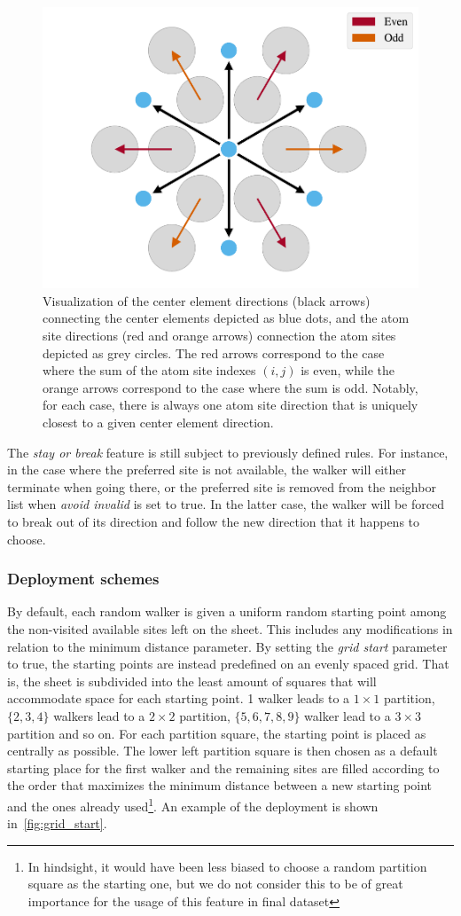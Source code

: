 \begin{figure}[!htb]
  \centering
  \includegraphics[width=0.5\linewidth]{figures/system/stay_or_break.pdf}
  \caption{Visualization of the center element directions (black arrows) connecting the center elements depicted as blue dots, and the atom site directions (red and orange arrows) connection the atom sites depicted as grey circles. The red arrows correspond to the case where the sum of the atom site indexes $(i,j)$ is even, while the orange arrows correspond to the case where the sum is odd. Notably, for each case, there is always one atom site direction that is uniquely closest to a given center element direction.}
  \label{fig:stay_or_break}
\end{figure}

The \textit{stay or break} feature is still subject to previously defined rules.
For instance, in the case where the preferred site is not available, the walker
will either terminate when going there, or the preferred site is removed from
the neighbor list when \textit{avoid invalid} is set to true. In the latter
case, the walker will be forced to break out of its direction and follow the new
direction that it happens to choose.


\subsubsection{Deployment schemes} %
By default, each random walker is given a uniform random starting point among
the non-visited available sites left on the sheet. This includes any
modifications in relation to the minimum distance parameter. By setting the
\textit{grid start} parameter to true, the starting points are instead
predefined on an evenly spaced grid. That is, the sheet is subdivided into the
least amount of squares that will accommodate space for each starting point. 1
walker leads to a $1\times 1$ partition, $\{2,3,4\}$ walkers lead to a $2\times
2$ partition, $\{5,6,7,8,9\}$ walker lead to a $3\times 3$ partition and so on.
For each partition square, the starting point is placed as centrally as
possible. The lower left partition square is then chosen as a default starting
place for the first walker and the remaining sites are filled according to the
order that maximizes the minimum distance between a new starting point and the
ones already used\footnote{In hindsight, it would have been less biased to
choose a random partition square as the starting one, but we do not consider
this to be of great importance for the usage of this feature in final dataset}.
An example of the deployment is shown in~\cref{fig:grid_start}.


